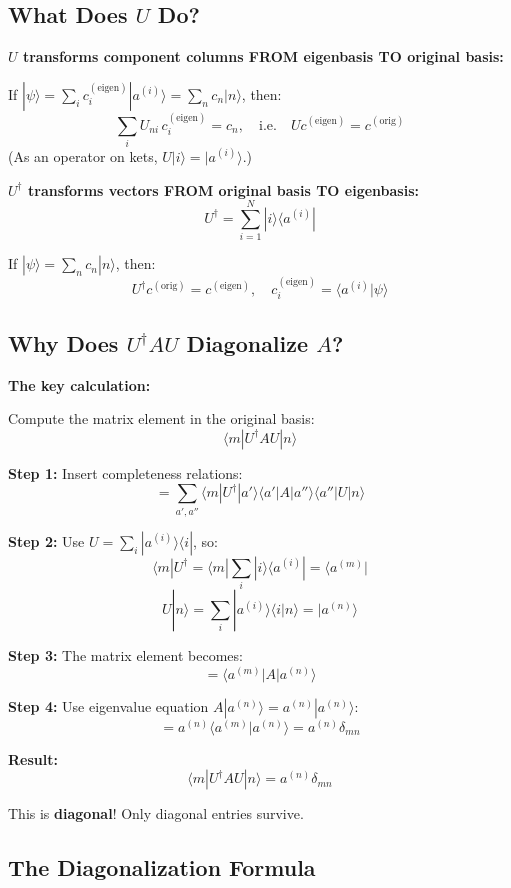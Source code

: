 \documentclass[11pt,a4paper]{article}
\begin{document}
\subsection*{What Does $U$ Do?}

\textbf{$U$ transforms component columns FROM eigenbasis TO original basis:}

If $|\psi\rangle = \sum_i c_i^{(\text{eigen})} |a^{(i)}\rangle = \sum_n c_n |n\rangle$, then:
$$\sum_i U_{ni}\, c_i^{(\text{eigen})} = c_n, \quad \text{i.e.} \quad U c^{(\text{eigen})} = c^{(\text{orig})}$$
(As an operator on kets, $U|i\rangle = |a^{(i)}\rangle$.)

\textbf{$U^\dagger$ transforms vectors FROM original basis TO eigenbasis:}
$$\boxed{U^\dagger = \sum_{i=1}^N |i\rangle\langle a^{(i)}|}$$

If $|\psi\rangle = \sum_n c_n |n\rangle$, then:
$$U^\dagger c^{(\text{orig})} = c^{(\text{eigen})}, \quad c_i^{(\text{eigen})} = \langle a^{(i)}|\psi\rangle$$

\subsection*{Why Does $U^\dagger A U$ Diagonalize $A$?}

\textbf{The key calculation:}

Compute the matrix element in the original basis:
$$\langle m|U^\dagger A U|n\rangle$$

\textbf{Step 1:} Insert completeness relations:
$$= \sum_{a',a''} \langle m|U^\dagger|a'\rangle\langle a'|A|a''\rangle\langle a''|U|n\rangle$$

\textbf{Step 2:} Use $U = \sum_i |a^{(i)}\rangle\langle i|$, so:
$$\langle m|U^\dagger = \langle m|\sum_i |i\rangle\langle a^{(i)}| = \langle a^{(m)}|$$
$$U|n\rangle = \sum_i |a^{(i)}\rangle\langle i|n\rangle = |a^{(n)}\rangle$$

\textbf{Step 3:} The matrix element becomes:
$$= \langle a^{(m)}|A|a^{(n)}\rangle$$

\textbf{Step 4:} Use eigenvalue equation $A|a^{(n)}\rangle = a^{(n)}|a^{(n)}\rangle$:
$$= a^{(n)}\langle a^{(m)}|a^{(n)}\rangle = a^{(n)}\delta_{mn}$$

\textbf{Result:}
$$\boxed{\langle m|U^\dagger A U|n\rangle = a^{(n)}\delta_{mn}}$$

This is \textbf{diagonal}! Only diagonal entries survive.

\subsection*{The Diagonalization Formula}
\end{document}

